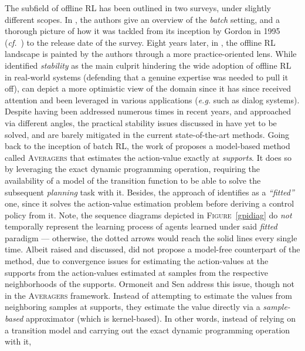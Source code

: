 The subfield of offline RL has been outlined in two surveys, under slightly different scopes.
In \cite{Lange2012-cc},
the authors give an overview of the \textit{batch} setting, and a thorough picture of how it was tackled from
its inception by Gordon in 1995 (\textit{cf.}~\cite{Gordon1995-er})
to the release date of the survey.
Eight years later,
in \cite{Levine2020-hz},
the offline RL landscape is painted by the authors through a more practice-oriented lens.
While \cite{Lange2012-cc}
identified \emph{stability} as the main culprit hindering the wide adoption of offline RL in real-world systems
(defending that a genuine expertise was needed to pull it off),
\cite{Levine2020-hz}
can depict a more optimistic view of the domain since it has since received attention and been leveraged in
various applications (\textit{e.g.} such as dialog systems).
Despite having been addressed numerous times in recent years, and approached via different angles,
the practical stability issues discussed in \cite{Lange2012-cc}
have yet to be solved, and are barely mitigated in the current state-of-the-art methods.
Going back to the inception of batch RL,
the work of \cite{Gordon1995-er}
proposes a model-based method called \textsc{Averagers} that estimates the action-value exactly at
\textit{supports}. It does so by leveraging the exact dynamic programming operation,
requiring the availability of a model of the transition function
to be able to solve the subsequent \emph{planning} task with it.
Besides, the approach of \cite{Gordon1995-er}
identifies as a \textit{``fitted''} one,
since it solves the action-value estimation problem before deriving a control policy from it.
Note, the sequence diagrams depicted in \textsc{Figure}~\ref{gpidiag} do \emph{not} temporally represent
the learning process of agents learned
under said \textit{fitted} paradigm --- otherwise, the dotted arrows would reach
the solid lines every single time.
Albeit raised and discussed, \cite{Gordon1995-er}
did not propose a model-free counterpart of the method,
due to convergence issues for estimating the action-values at the supports
from the action-values estimated at samples from the respective neighborhoods of the supports.
Ormoneit and Sen \cite{Ormoneit2002-wk}
address this issue, though not in the \textsc{Averagers} framework.
Instead of attempting to estimate the values from neighboring samples
at supports, they
estimate the value directly via a \emph{sample-based} approximator (which is kernel-based).
In other words, instead of relying on a transition model and carrying out
the exact dynamic programming operation with it,

